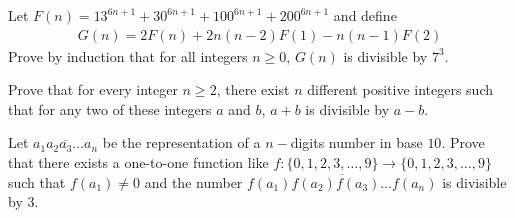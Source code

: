 \documentclass{subfile}
\begin{document}
	\begin{problem}
		Let $F(n) = 13^{6n+1} + 30^{6n+1} + 100^{6n+1} + 200^{6n+1}$ and define
			\begin{align*}
				G(n) = 2F(n) + 2n(n - 2)F(1) - n(n - 1)F(2)
			\end{align*}
		Prove by induction that for all integers $n \geq 0$, $G(n)$ is divisible by $7^3$. %
	\end{problem}

	\begin{problem}
		Prove that for every integer $n \geq 2$, there exist $n$ different positive integers such that for any two of these integers $a$ and $b$, $a+b$ is divisible by $a - b.$ %
	\end{problem}

%

	\begin{problem}
		Let $\overline{a_1a_2a_3\ldots a_n}$ be the representation of a $n-$digits number in base $10.$ Prove that there exists a one-to-one function like $f : \{0, 1, 2, 3, \ldots, 9\} \to \{0, 1, 2, 3, \ldots, 9\}$ such that $f(a_1) \neq 0$ and the number $\overline{ f(a_1)f(a_2)f(a_3) \ldots f(a_n) }$ is divisible by $3.$ %
	\end{problem}

\end{document}
